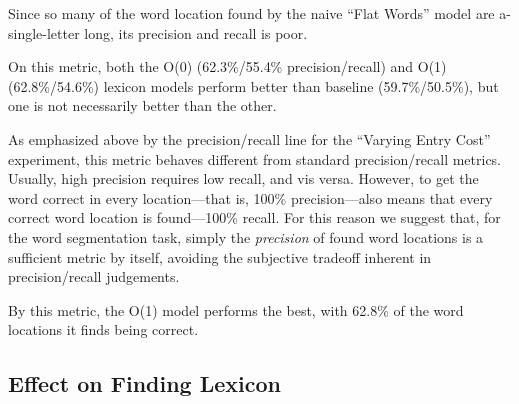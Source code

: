 \documentclass[11pt, oneside, fleqn]{article}
\begin{document}
	Since so many of the word location found by the naive ``Flat Words'' model are a-single-letter long, its precision and recall is poor.

	On this metric, both the O(0) (62.3\%/55.4\% precision/recall) and O(1) (62.8\%/54.6\%) lexicon models perform better than baseline (59.7\%/50.5\%), but one is not necessarily better than the other.

	As emphasized above by the precision/recall line for the ``Varying Entry Cost'' experiment, this metric behaves different from standard precision/recall metrics. Usually, high precision requires low recall, and vis versa. However, to get the word correct in every location---that is, 100\% precision---also means that every correct word location is found---100\% recall. For this reason we suggest that, for the word segmentation task, simply the \textit{precision} of found word locations is a sufficient metric by itself, avoiding the subjective tradeoff inherent in precision/recall judgements.
	
	By this metric, the O(1) model performs the best, with 62.8\% of the word locations it finds being correct.

  \subsection{Effect on Finding Lexicon}
\end{document}
